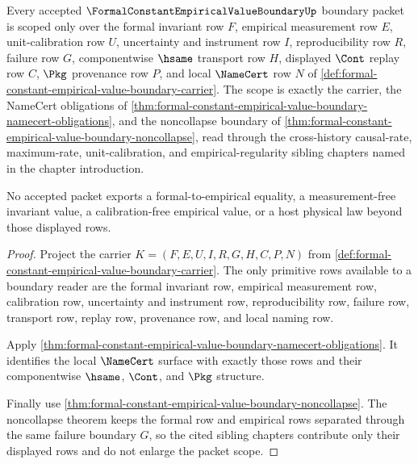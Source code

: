 \begin{theorem}
\label{thm:formal-constant-empirical-value-boundary-scope}
Every accepted $\FormalConstantEmpiricalValueBoundaryUp$ boundary packet is scoped only over the formal invariant row $F$, empirical measurement row $E$, unit-calibration row $U$, uncertainty and instrument row $I$, reproducibility row $R$, failure row $G$, componentwise $\hsame$ transport row $H$, displayed $\Cont$ replay row $C$, $\Pkg$ provenance row $P$, and local $\NameCert$ row $N$ of \autoref{def:formal-constant-empirical-value-boundary-carrier}. The scope is exactly the carrier, the NameCert obligations of \autoref{thm:formal-constant-empirical-value-boundary-namecert-obligations}, and the noncollapse boundary of \autoref{thm:formal-constant-empirical-value-boundary-noncollapse}, read through the cross-history causal-rate, maximum-rate, unit-calibration, and empirical-regularity sibling chapters named in the chapter introduction.

No accepted packet exports a formal-to-empirical equality, a measurement-free invariant value, a calibration-free empirical value, or a host physical law beyond those displayed rows.
\end{theorem}
\begin{proof}
Project the carrier $K=(F,E,U,I,R,G,H,C,P,N)$ from \autoref{def:formal-constant-empirical-value-boundary-carrier}. The only primitive rows available to a boundary reader are the formal invariant row, empirical measurement row, calibration row, uncertainty and instrument row, reproducibility row, failure row, transport row, replay row, provenance row, and local naming row.

Apply \autoref{thm:formal-constant-empirical-value-boundary-namecert-obligations}. It identifies the local $\NameCert$ surface with exactly those rows and their componentwise $\hsame$, $\Cont$, and $\Pkg$ structure.

Finally use \autoref{thm:formal-constant-empirical-value-boundary-noncollapse}. The noncollapse theorem keeps the formal row and empirical rows separated through the same failure boundary $G$, so the cited sibling chapters contribute only their displayed rows and do not enlarge the packet scope.
\end{proof}

